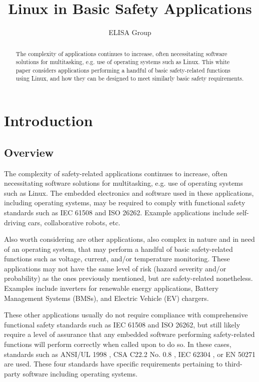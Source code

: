 \documentclass[12pt]{../Common_files/ElisaPaper}
\title{Linux in Basic Safety Applications}
\author{ELISA Group}
\begin{document}
	
\maketitle	
\begin{abstract}
The complexity of applications continues to increase, often necessitating software solutions for multitasking, e.g. use of operating systems such as Linux.  This white paper considers applications performing a handful of basic safety-related functions using Linux, and how they can be designed to meet similarly basic safety requirements.
\end{abstract}

\tableofcontents

\section{Introduction}
\subsection{Overview}
The complexity of safety-related applications continues to increase, often necessitating software solutions for multitasking, e.g. use of operating systems such as Linux.  The embedded electronics and software used in these applications, including operating systems, may be required to comply with functional safety standards such as IEC 61508 and ISO 26262.  Example applications include self-driving cars, collaborative robots, etc.  

\bigbreak
Also worth considering are other applications, also complex in nature and in need of an operating system, that may perform a handful of basic safety-related functions such as voltage, current, and/or temperature monitoring.  These applications may not have the same level of risk (hazard severity and/or probability) as the ones previously mentioned, but are safety-related nonetheless.  Examples include inverters for renewable energy applications, Battery Management Systems (BMSs), and Electric Vehicle (EV) chargers.

\bigbreak
These other applications usually do not require compliance with comprehensive functional safety standards such as IEC 61508 and ISO 26262, but still likely require a level of assurance that any embedded software performing safety-related functions will perform correctly when called upon to do so.  In these cases, standards such as ANSI/UL 1998 \cite{UL1998}, CSA C22.2 No. 0.8 \cite{CSA0.8}, IEC 62304 \cite{IEC62304}, or EN 50271 \cite{EN50271} are used.  These four standards have specific requirements pertaining to third-party software including operating systems.
\end{document}
